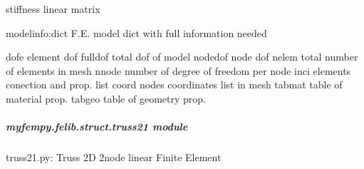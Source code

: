 \documentclass[letterpaper,10pt,english]{sphinxmanual}
\begin{document}
\begin{fulllineitems}
\begin{fulllineitems}
\label{\detokenize{myfempy.felib.struct:myfempy.felib.struct.spring21.Spring21.stiff_linear}}
\pysigstartsignatures
{}
\pysigstopsignatures
\sphinxAtStartPar
stiffness linear matrix

\end{fulllineitems}


\begin{fulllineitems}
\label{\detokenize{myfempy.felib.struct:myfempy.felib.struct.spring21.Spring21.tabgeo}}
\pysigstartsignatures
{}
\pysigstopsignatures\begin{description}
\sphinxAtStartPar
modelinfo:dict     \textendash{} F.E. model dict with full information needed

\sphinxAtStartPar
dofe              \textendash{} element dof
fulldof           \textendash{} total dof of model
nodedof           \textendash{} node dof 
nelem             \textendash{} total number of elements in mesh
nnode             \textendash{} number of degree of freedom per node
inci              \textendash{} elements conection and prop. list
coord             \textendash{} nodes coordinates list in mesh
tabmat            \textendash{} table of material prop.
tabgeo            \textendash{} table of geometry prop.

\end{description}

\end{fulllineitems}


\end{fulllineitems}



\subparagraph{myfempy.felib.struct.truss21 module}
\label{\detokenize{myfempy.felib.struct:module-myfempy.felib.struct.truss21}}\label{\detokenize{myfempy.felib.struct:myfempy-felib-struct-truss21-module}}
\sphinxAtStartPar
truss21.py: Truss 2D 2\sphinxhyphen{}node linear Finite Element
\end{document}
